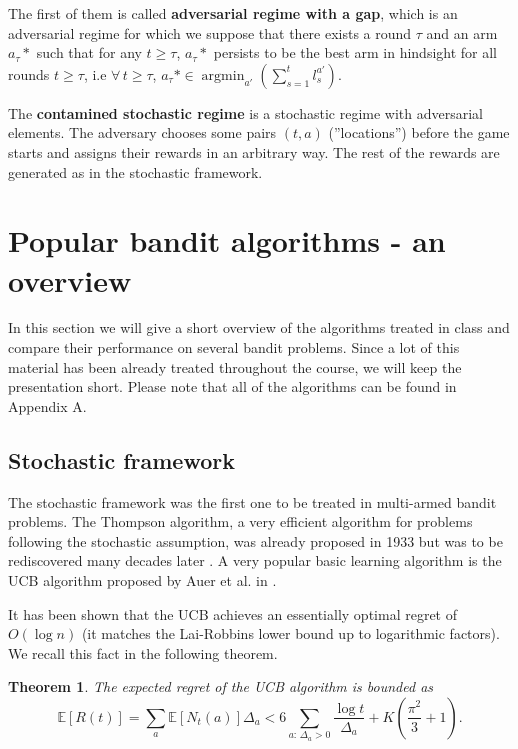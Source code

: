 \documentclass[11pt]{article}
\newcommand{\argmin}{\operatorname{arg min}}
\newtheorem{theorem}{Theorem}
\begin{document}
The first of them is called \textbf{adversarial regime with a gap}, which is an adversarial regime for which we suppose that there exists a round $\tau$ and an arm $a_{\tau}*$ such that for any $t \geq \tau$, $a_{\tau}*$ persists to be the best arm in hindsight for all rounds $t \geq \tau$, i.e $\forall \, t \geq \tau$,  $a_{\tau}* \in \argmin_{a'}(\sum_{s=1}^{t}l_{s}^{a'})$.

The \textbf{contamined stochastic regime} is a stochastic regime with adversarial elements. The adversary chooses some pairs $(t,a)$ (''locations'') before the game starts and assigns their rewards in an arbitrary way. The rest of the rewards are generated as in the stochastic framework.

\section*{Popular bandit algorithms - an overview}

In this section we will give a short overview of the algorithms treated in class and compare their performance on several bandit problems. Since a lot of this material has been already treated throughout the course, we will keep the presentation short. Please note that all of the algorithms can be found in Appendix A. 

\subsection*{Stochastic framework}

The stochastic framework was the first one to be treated in multi-armed bandit problems. The Thompson algorithm, a very efficient algorithm for problems following the stochastic assumption, was already proposed in 1933 but was to be rediscovered many decades later \cite{Thom33}. A very popular basic learning algorithm is the UCB algorithm proposed by Auer et al. in \cite{Auer02a}.

It has been shown that the UCB achieves an essentially optimal regret of $O(\log n)$ (it matches the Lai-Robbins lower bound up to logarithmic factors). We recall this fact in the following theorem.
\begin{theorem}
The expected regret of the UCB algorithm is bounded as
$$ \mathbb{E}[R(t)] = \sum_{a}\mathbb{E}[N_{t}(a)]\Delta_{a} <
 6 \sum_{a: \, \Delta_a > 0} \frac{\log t}{\Delta_a} + K (\frac{\pi^2}{3} + 1).$$
\end{theorem}
\end{document}
